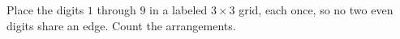 Place the digits $1$ through $9$ in a labeled $3\times3$ grid, each once, so no two even digits share an edge. Count the arrangements.
